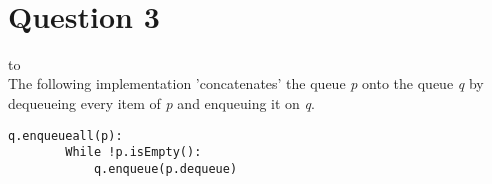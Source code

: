 \documentclass[a4paper]{article}
\def\headline#1{\hbox to \hsize{\hrulefill\quad\lower.3em\hbox{#1}\quad\hrulefill}}
\begin{document}
\ \\
\section*{Question 3}
\headline{-} \ \\
The following implementation 'concatenates' the queue \textit{p} onto the queue \textit{q} by
dequeueing every item of \textit{p} and enqueuing it on \textit{q}.
 \\

\noindent

\begin{lstlisting}[escapeinside={{*}{*}}]
    q.enqueueall(p):
        While !p.isEmpty():
            q.enqueue(p.dequeue)
\end{lstlisting}
\end{document}
